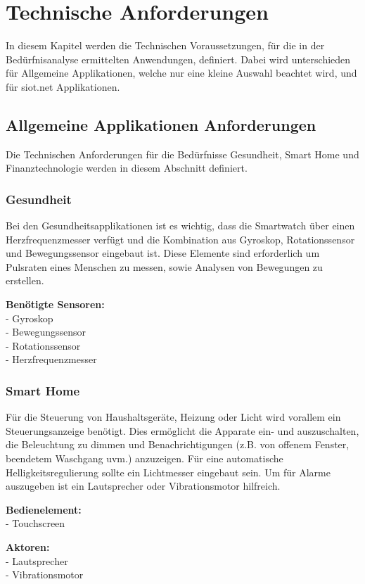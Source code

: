 \chapter{Technische Anforderungen}
In diesem Kapitel werden die Technischen Voraussetzungen, für die in der Bedürfnisanalyse ermittelten Anwendungen, definiert. Dabei wird unterschieden für Allgemeine Applikationen, welche nur eine kleine Auswahl beachtet wird, und für siot.net Applikationen.

\section{Allgemeine Applikationen Anforderungen}
Die Technischen Anforderungen für die Bedürfnisse Gesundheit, Smart Home und Finanztechnologie werden in diesem Abschnitt definiert.

\subsection{Gesundheit}
Bei den Gesundheitsapplikationen ist es wichtig, dass die Smartwatch über einen Herzfrequenzmesser verfügt und die Kombination aus Gyroskop, Rotationssensor und Bewegungssensor eingebaut ist.
Diese Elemente sind erforderlich um Pulsraten eines Menschen zu messen, sowie Analysen von Bewegungen zu erstellen.

\textbf{Benötigte Sensoren:}\\
- Gyroskop\\
- Bewegungssensor\\
- Rotationssensor\\
- Herzfrequenzmesser

\subsection{Smart Home}
Für die Steuerung von Haushaltsgeräte, Heizung oder Licht wird vorallem ein Steuerungsanzeige benötigt. Dies ermöglicht die Apparate ein- und auszuschalten, die Beleuchtung zu dimmen und Benachrichtigungen (z.B. von offenem Fenster, beendetem Waschgang uvm.) anzuzeigen. Für eine automatische Helligkeitsregulierung sollte ein Lichtmesser eingebaut sein. Um für Alarme auszugeben ist ein Lautsprecher oder Vibrationsmotor hilfreich.

\textbf{Bedienelement:}\\
- Touchscreen

\textbf{Aktoren:}\\
- Lautsprecher\\
- Vibrationsmotor

